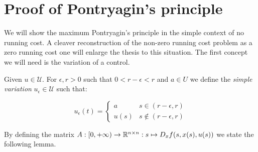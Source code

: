 \section{Proof of Pontryagin's principle}

We will show the maximum Pontryagin's principle in the simple context of no running cost. 
A cleaver reconstruction of the non-zero running cost problem as a zero running cost one 
will enlarge the thesis to this situation. The first concept we will need is the variation 
of a control.

\begin{definition}
    Given $u\in\mathcal{U}$. For $\epsilon,r>0$ such that $0<r-\epsilon<r$ and $a\in U$ 
    we define the \textit{simple variation} $u_{\epsilon}\in\mathcal{U}$ such that:

    \begin{equation}\label{1-proofpontry-defvar}
        u_{\epsilon}(t) = \begin{cases}
            a & s\in(r-\epsilon,r) \\
            u(s) & s\notin(r-\epsilon,r)
        \end{cases}
    \end{equation}
\end{definition}

By defining the matrix $A:[0,+\infty)\rightarrow\mathbb{R}^{n\times n}: s\mapsto D_xf(s,x(s),u(s))$ we state 
the following lemma.


